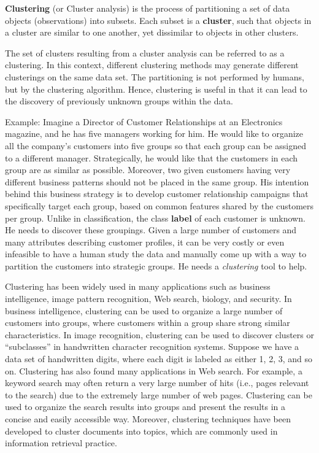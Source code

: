 \documentclass[]{book}
\begin{document}
\textbf{Clustering} (or Cluster analysis) is the process of partitioning
a set of data objects (observations) into subsets. Each subset is a
\textbf{cluster}, such that objects in a cluster are similar to one
another, yet dissimilar to objects in other clusters.

The set of clusters resulting from a cluster analysis can be referred to
as a clustering. In this context, different clustering methods may
generate different clusterings on the same data set. The partitioning is
not performed by humans, but by the clustering algorithm. Hence,
clustering is useful in that it can lead to the discovery of previously
unknown groups within the data.

Example: Imagine a Director of Customer Relationships at an Electronics
magazine, and he has five managers working for him. He would like to
organize all the company's customers into five groups so that each group
can be assigned to a different manager. Strategically, he would like
that the customers in each group are as similar as possible. Moreover,
two given customers having very different business patterns should not
be placed in the same group. His intention behind this business strategy
is to develop customer relationship campaigns that specifically target
each group, based on common features shared by the customers per group.
Unlike in classification, the class \textbf{label} of each customer is
unknown. He needs to discover these groupings. Given a large number of
customers and many attributes describing customer profiles, it can be
very costly or even infeasible to have a human study the data and
manually come up with a way to partition the customers into strategic
groups. He needs a \emph{clustering} tool to help.

Clustering has been widely used in many applications such as business
intelligence, image pattern recognition, Web search, biology, and
security. In business intelligence, clustering can be used to organize a
large number of customers into groups, where customers within a group
share strong similar characteristics. In image recognition, clustering
can be used to discover clusters or ``subclasses'' in handwritten
character recognition systems. Suppose we have a data set of handwritten
digits, where each digit is labeled as either 1, 2, 3, and so on.
Clustering has also found many applications in Web search. For example,
a keyword search may often return a very large number of hits (i.e.,
pages relevant to the search) due to the extremely large number of web
pages. Clustering can be used to organize the search results into groups
and present the results in a concise and easily accessible way.
Moreover, clustering techniques have been developed to cluster documents
into topics, which are commonly used in information retrieval practice.
\end{document}

